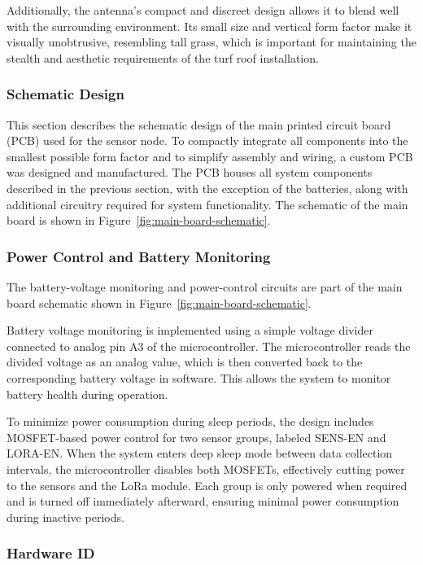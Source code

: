 Additionally, the antenna's compact and discreet design allows it to
blend well with the surrounding environment. Its small size and vertical
form factor make it visually unobtrusive, resembling tall grass, which
is important for maintaining the stealth and aesthetic requirements of
the turf roof installation.

\subsubsection{Schematic Design}

This section describes the schematic design of the main
printed circuit board (PCB) used for the sensor node. To compactly
integrate all components into the smallest possible form factor and to
simplify assembly and wiring, a custom PCB was designed and
manufactured. The PCB houses all system components described in the
previous section, with the exception of the batteries, along with
additional circuitry required for system
functionality. The schematic of the main board is shown in Figure~\ref{fig:main-board-schematic}.

\subsubsection{Power Control and Battery Monitoring}

The battery-voltage monitoring and power-control circuits are part of the main board schematic shown in Figure~\ref{fig:main-board-schematic}.

Battery voltage monitoring is implemented using a simple voltage divider
connected to analog pin A3 of the microcontroller. The microcontroller
reads the divided voltage as an analog value, which is then converted
back to the corresponding battery voltage in software. This allows the
system to monitor battery health during operation.

To minimize power consumption during sleep periods, the design includes
MOSFET-based power control for two sensor groups, labeled SENS-EN and
LORA-EN. When the system enters deep sleep mode between data collection
intervals, the microcontroller disables both MOSFETs, effectively
cutting power to the sensors and the LoRa module. Each group is only
powered when required and is turned off immediately afterward, ensuring
minimal power consumption during inactive periods.

\subsubsection{Hardware ID}


